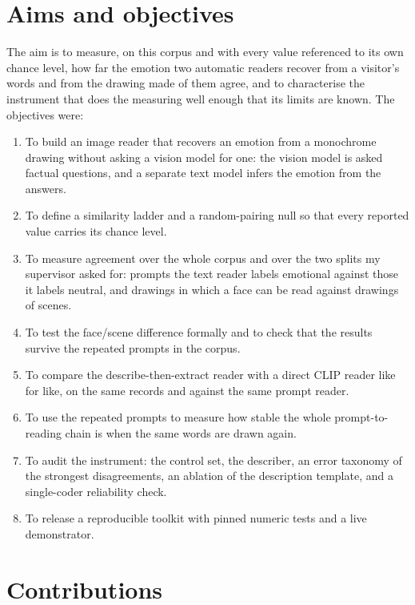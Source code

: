 \section{Aims and objectives}
\label{sec:intro-aims}

The aim is to measure, on this corpus and with every value referenced to its own chance level, how far the emotion two automatic readers recover from a visitor's words and from the drawing made of them agree, and to characterise the instrument that does the measuring well enough that its limits are known. The objectives were:

\begin{enumerate}\setlength{\itemsep}{1pt}
\item To build an image reader that recovers an emotion from a monochrome drawing without asking a vision model for one: the vision model is asked factual questions, and a separate text model infers the emotion from the answers.
\item To define a similarity ladder and a random-pairing null so that every reported value carries its chance level.
\item To measure agreement over the whole corpus and over the two splits my supervisor asked for: prompts the text reader labels emotional against those it labels neutral, and drawings in which a face can be read against drawings of scenes.
\item To test the face/scene difference formally and to check that the results survive the repeated prompts in the corpus.
\item To compare the describe-then-extract reader with a direct CLIP reader like for like, on the same records and against the same prompt reader.
\item To use the repeated prompts to measure how stable the whole prompt-to-reading chain is when the same words are drawn again.
\item To audit the instrument: the control set, the describer, an error taxonomy of the strongest disagreements, an ablation of the description template, and a single-coder reliability check.
\item To release a reproducible toolkit with pinned numeric tests and a live demonstrator.
\end{enumerate}

\section{Contributions}
\label{sec:intro-contributions}

